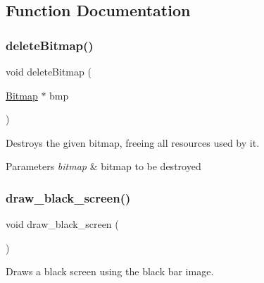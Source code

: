 \subsection{Function Documentation}
\mbox{\label{group___bitmap_ga08c1d4f4fff81df260d979ea8fc1aa61}} 
\subsubsection{\texorpdfstring{delete\+Bitmap()}{deleteBitmap()}}
{\footnotesize\ttfamily void delete\+Bitmap (\begin{DoxyParamCaption}\item[{\hyperlink{struct_bitmap}{Bitmap} $\ast$}]{bmp }\end{DoxyParamCaption})}



Destroys the given bitmap, freeing all resources used by it. 


\begin{DoxyParams}{Parameters}
{\em bitmap} & bitmap to be destroyed \\
\hline
\end{DoxyParams}
\mbox{\label{group___bitmap_ga66c6cdf9473527bd3dcbab53d147d5b9}} 
\subsubsection{\texorpdfstring{draw\+\_\+black\+\_\+screen()}{draw\_black\_screen()}}
{\footnotesize\ttfamily void draw\+\_\+black\+\_\+screen (\begin{DoxyParamCaption}{ }\end{DoxyParamCaption})}



Draws a black screen using the black bar image. 

